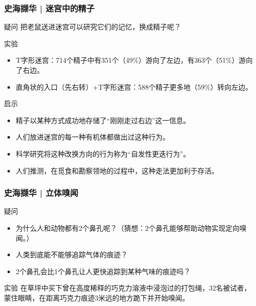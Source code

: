 \begin{frame}
  \frametitle{史海撷华 | 迷宫中的精子}
  \begin{block}{疑问}
    把老鼠送进迷宫可以研究它们的记忆，换成精子呢？
  \end{block}
  \pause
  \begin{block}{实验}
    \begin{itemize}
      \item T字形迷宫：714个精子中有351个（49\%）游向了左边，有363个（51\%）游向了右边。
      \item 直角状的入口（先右转）+T字形迷宫：588个精子更多地（59\%）转向左边。
    \end{itemize}
  \end{block}
  \pause
  \begin{block}{启示}
    \begin{itemize}
      \item 精子以某种方式成功地存储了“刚刚走过右边”这一信息。
      \item 人们放进迷宫的每一种有机体都做出过这种行为。
      \item 科学研究将这种改换方向的行为称为“自发性更迭行为”。
      \item 人们推测，在觅食和勘察领地的过程中，这种走法更加利于存活。
    \end{itemize}
  \end{block}
\end{frame}

\begin{frame}
  \frametitle{史海撷华 | 立体嗅闻}
  \begin{block}{疑问}
    \begin{itemize}
      \item 为什么人和动物都有2个鼻孔呢？（猜想：2个鼻孔能够帮助动物实现定向嗅闻。）
      \item 人类到底能不能够追踪气体的痕迹？
      \item 2个鼻孔会比1个鼻孔让人更快追踪到某种气味的痕迹吗？
    \end{itemize}
  \end{block}
  \pause
  \begin{block}{实验}
    在草坪中买下曾在高度稀释的巧克力溶液中浸泡过的打包绳，32名被试者，蒙住眼睛，在距离巧克力痕迹3米远的地方跪下并开始嗅闻。
  \end{block}
\end{frame}

